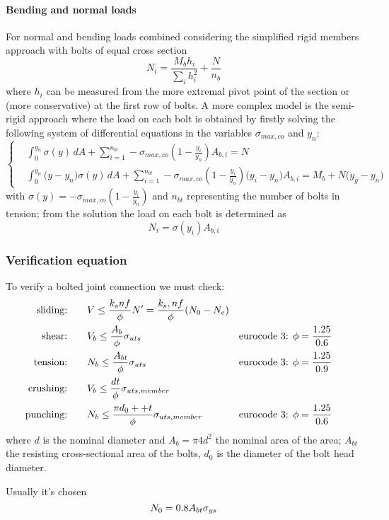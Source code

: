 	\paragraph{Bending and normal loads} For normal and bending loads combined considering the simplified rigid members approach with bolts of equal cross section
	\[ N_i = \frac{M_b h_i}{\sum_i h_i^2} + \frac N{n_b} \]
	where $h_i$ can be measured from the more extremal pivot point of the section or (more conservative) at the first row of bolts. A more complex model is the semi-rigid approach where the load on each bolt is obtained by firstly solving the following system of differential equations in the variables $\sigma_{max,co}$ and $y_n$:
	\[ \left\{ \begin{aligned}
		& \int_0^{y_n} \sigma(y)\, dA + \sum_{i=1}^{n_{bt}} - \sigma_{max,co}\left(1-\frac{y_i}{y_n}\right)A_{b,i} = N \\
		& \int_0^{y_n} \big(y-y_n\big) \sigma(y)\, dA + \sum_{i=1}^{n_{bt}} - \sigma_{max,co}\left(1-\frac{y_i}{y_n}\right)\big(y_i-y_n\big)A_{b,i} = M_b 	+ N \big(y_g-y_n\big)
	\end{aligned} \right.   \]
	with $\sigma(y) = -\sigma_{max,co}\left(1-\frac{y_i}{y_n}\right)$ and $n_{bt}$ representing the number of bolts in tension; from the solution the load on each bolt is determined as
	\[ N_i = \sigma(y_i) A_{b,i} \]
	
\subsubsection*{Verification equation}
	To verify a bolted joint connection we must check:
	\begin{equation} \label{eq:boltverifications}
	\begin{aligned}
		\textrm{sliding:} \qquad & V \leq \frac{k_s n f}{\phi} N' = \frac{k_s,nf}\phi(N_0-N_e) \\
		\textrm{shear:} \qquad & V_b \leq \frac {A_b} \phi\sigma_{uts} && \textrm{eurocode 3: }\phi = \frac{1.25}{0.6}  \\
		\textrm{tension:} \qquad & N_b \leq \frac {A_{bt}} \phi \sigma_{uts} \qquad && \textrm{eurocode 3: }\phi = \frac{1.25}{0.9}  \\
		\textrm{crushing:} \qquad & V_b \leq \frac{dt}{\phi}\sigma_{uts,member} \\
		\textrm{punching:} \qquad & N_b \leq \frac{\pi d_0++ t}{\phi}\sigma_{uts,member}&& \textrm{eurocode 3: }\phi = \frac{1.25}{0.6}
	\end{aligned}
	\end{equation}
	where $d$ is the nominal diameter and $A_b = \pi 4 d^2$ the nominal area of the area; $A_{bt}$ the resisting cross-sectional area of the bolts, $d_0$ is the diameter of the bolt head diameter.
	
	Usually it's chosen
	\[ N_0 = 0.8 A_{bt}\sigma_{ys} \]
	
	
	
	
	
	
	
	
	
	
	
	
	
	
	
	
	
	
	
	
	